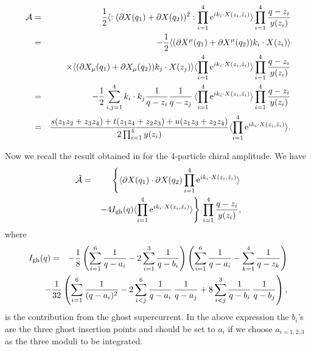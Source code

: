 \documentclass[a4paper,12pt]{article}
\begin{document}
\begin{eqnarray}
{\cal A}  & = &  {1\over 2} \langle : (\partial  X(q_1)+
\partial X(q_2) )^2 : \prod_{i=1}^4 \hbox{e}^{i k_i \cdot X(z_i, \bar
z_i)} \rangle  \prod_{i=1}^4 { q -z_i\over y(z_i) } \nonumber \\
& = & - {1\over 2} \langle (\partial X^\mu(q_1) + \partial
X^\mu(q_2)) k_i\cdot X(z_i) \rangle \nonumber \\
& & \times \langle (\partial X_\mu(q_1) +
\partial X_\mu(q_2)) k_j\cdot X(z_j) \rangle
\langle \prod_{i=1}^4 \hbox{e}^{i k_i \cdot X(z_i, \bar z_i)}
\rangle \prod_{i=1}^4 { q -z_i\over y(z_i) } \nonumber \\
& =  & - {1\over 2}\sum_{i,j=1}^4 k_i \cdot k_j {1\over
q-z_i}{1\over q-z_j} \, \langle \prod_{i=1}^4 \hbox{e}^{i k_i
\cdot X(z_i, \bar z_i)} \rangle \prod_{i=1}^4 { q -z_i\over y(z_i)
} \nonumber \\
& = &    { s (z_1z_2 + z_3 z_4) + t (z_1z_4 + z_2 z_3 ) + u (z_1
z_3 + z_2 z_4) \over 2 \prod_{i=1}^4  y(z_i)} \langle
\prod_{i=1}^4 \hbox{e}^{i k_i \cdot X(z_i, \bar z_i)} \rangle .
\end{eqnarray}

Now we recall the result obtained in \cite{IengoZhu2, IengoZhu3,
Zhu} for the 4-particle chiral amplitude. We have
\begin{eqnarray}
\tilde{\cal A} & = & \left\{ \langle  \partial X(q_1) \cdot
\partial X(q_2)  \prod_{i=1}^4 \hbox{e}^{i k_i \cdot X(z_i, \bar
z_i)}
\rangle \right. \nonumber \\
& & \left. -4 I_{\rm gh}(q) \langle \prod_{i=1}^4 \hbox{e}^{i k_i
\cdot X(z_i, \bar z_i)} \rangle \right\} \, \prod_{i=1}^4 { q -
z_i \over y(z_i)},
\end{eqnarray}
where
\begin{eqnarray}
I_{\rm gh}(q) & = & - {1\over 8}\left( \sum_{i=1}^6 {1\over q -
a_i} - 2 \sum_{i=1}^3{1 \over q - b_i} \right) \left(\sum_{i=1}^6{
1\over q - a_i} - \sum_{k=1}^4  {1\over q- z_k}\right) \nonumber
\\
&  & \hskip -1cm - { 1\over 32}\left( \sum_{i=1}^6 {1\over
(q-a_i)^2} - 2 \sum_{i<j}^6{1\over q-a_i} \, {1\over q -a_j} + 8
\sum_{i<j}^3 {1\over q-b_i} \, {1\over q-b_j}\right) ,
\end{eqnarray}
is the contribution from the ghost supercurrent. In the above
expression the $b_i$'s are the three ghost insertion points and
should be set to $a_i$ if we choose $a_{i=1,2,3}$ as the three
moduli to be integrated.
\end{document}
